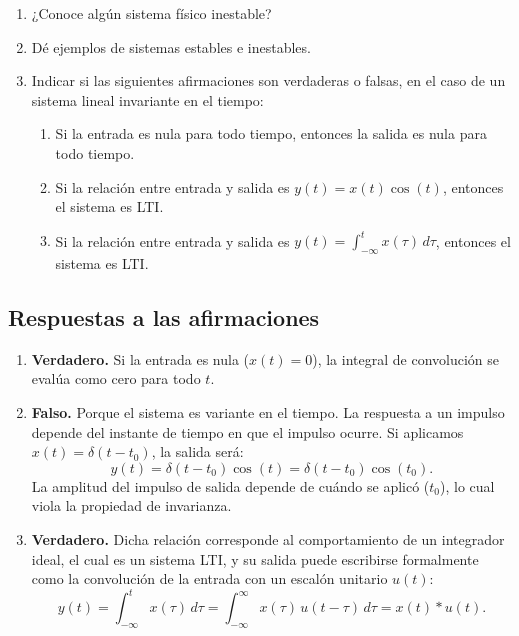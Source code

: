 \begin{enumerate}
	\item ¿Conoce algún sistema físico inestable?
	\item Dé ejemplos de sistemas estables e inestables.
	\item Indicar si las siguientes afirmaciones son verdaderas o falsas, en el caso de un sistema lineal invariante en el tiempo:
	\begin{enumerate}
		\item Si la entrada es nula para todo tiempo, entonces la salida es nula para todo tiempo.
		\item Si la relación entre entrada y salida es $y(t) = x(t) \cos(t)$, entonces el sistema es LTI.
		\item Si la relación entre entrada y salida es $y(t) = \int_{-\infty}^{t} x(\tau) \, d\tau$, entonces el sistema es LTI.
	\end{enumerate}
\end{enumerate}

\subsection{Respuestas a las afirmaciones}

\begin{enumerate}
	\item \textbf{Verdadero.} Si la entrada es nula ($x(t)=0$), la integral de convolución se evalúa como cero para todo $t$.
	
	\item \textbf{Falso.} Porque el sistema es variante en el tiempo. La respuesta a un impulso depende del instante de tiempo en que el impulso ocurre. Si aplicamos $x(t) = \delta(t - t_0)$, la salida será:
	\begin{equation}
		y(t) = \delta(t - t_{0}) \cos(t) = \delta(t - t_{0}) \cos(t_{0}).
	\end{equation}
	La amplitud del impulso de salida depende de cuándo se aplicó ($t_0$), lo cual viola la propiedad de invarianza.
	
	\item \textbf{Verdadero.} Dicha relación corresponde al comportamiento de un integrador ideal, el cual es un sistema LTI, y su salida puede escribirse formalmente como la convolución de la entrada con un escalón unitario $u(t)$:
	\begin{equation}
		y(t) = \int_{-\infty}^{t} x(\tau) \, d\tau = \int_{-\infty}^{\infty} x(\tau) \, u(t-\tau) \, d\tau = x(t) * u(t).
	\end{equation}
\end{enumerate}
